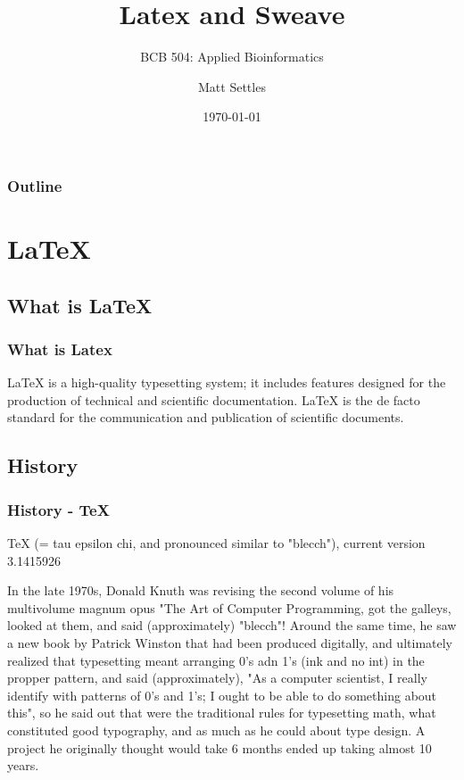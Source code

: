 \documentclass[pdf]{beamer}
\begin{document}
\title[LaTeX and Sweave]{Latex and Sweave}
\subtitle{BCB 504: Applied Bioinformatics\\}
\author[Matt Settles]{Matt Settles}
\date{\today}


\begin{frame}[plain]
  \titlepage
\end{frame}


\begin{frame}[plain] 
  \frametitle{Outline}
  \tableofcontents
\end{frame}

\section{LaTeX}
\subsection{What is LaTeX}
\begin{frame}
  \frametitle{What is Latex}
LaTeX is a high-quality typesetting system; it includes features designed for the production of technical and scientific documentation. LaTeX is the de facto standard for the communication and publication of scientific documents.
\end{frame}

\subsection{History}
\begin{frame} 
  \frametitle{History - TeX}
  TeX (= tau epsilon chi, and pronounced similar to "blecch"), current version 3.1415926
  
  
  In the late 1970s, Donald Knuth was revising the second volume of his multivolume magnum opus "The Art of Computer Programming, got the galleys, looked at them, and said (approximately) "blecch"! Around the same time, he saw a new book by Patrick Winston that had been produced digitally, and ultimately realized that typesetting meant arranging 0's adn 1's (ink and no int) in the propper pattern, and said (approximately), "As a computer scientist, I really identify with patterns of 0's and 	1's; I ought to be able to do something about this", so he said out that were the traditional rules for typesetting math, what constituted good typography, and as much as he could about type design. A project he originally thought would take 6 months ended up taking almost 10 years.
\end{frame}
\end{document}
